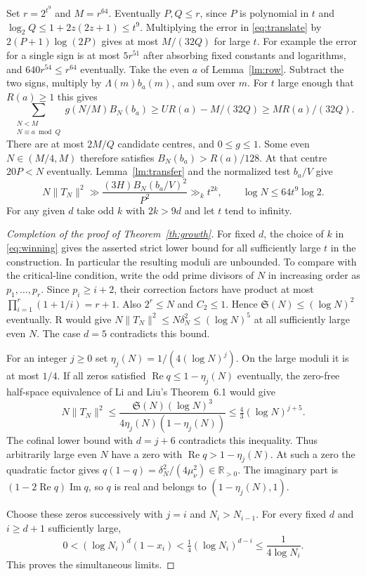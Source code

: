 \documentclass[11pt,a4paper]{article}
\newcommand{\SSg}{\mathfrak S}
\DeclareMathOperator{\Rea}{Re}
\begin{document}
Set $r=2^{t^9}$ and $M=r^{64}$. Eventually $P,Q\le r$, since $P$ is polynomial in $t$ and $\log_2 Q\le 1+2z(2z+1)\le t^9$. Multiplying the error in \eqref{eq:translate} by $2(P+1)\log(2P)$ gives at most $M/(32Q)$ for large $t$. For example the error for a single sign is at most $5r^{51}$ after absorbing fixed constants and logarithms, and $640r^{54}\le r^{64}$ eventually. Take the even $a$ of Lemma~\ref{lm:row}. Subtract the two signs, multiply by $\Lambda(m)b_a(m)$, and sum over $m$. For $t$ large enough that $R(a)\ge1$ this gives
\[
 \sum_{\substack{N<M\\N\equiv a\bmod Q}}g(N/M) B_N(b_a)
 \ge U R(a)-M/(32Q)\ge M R(a)/(32Q).
\]
There are at most $2M/Q$ candidate centres, and $0\le g\le1$. Some even $N\in(M/4,M)$ therefore satisfies $B_N(b_a)>R(a)/128$. At that centre $20P<N$ eventually. Lemma~\ref{lm:transfer} and the normalized test $b_a/V$ give
\begin{equation}\label{eq:winning}
  N\|T_N\|^2\gg \frac{(3H)B_N(b_a/V)^2}{P^2}
       \gg_k t^{2k},\qquad \log N\le64t^9\log2 .
\end{equation}
For any given $d$ take odd $k$ with $2k>9d$ and let $t$ tend to infinity.

\begin{proof}[Completion of the proof of Theorem~\ref{th:growth}]
For fixed $d$, the choice of $k$ in \eqref{eq:winning} gives the asserted strict lower bound for all sufficiently large $t$ in the construction. In particular the resulting moduli are unbounded. To compare with the critical-line condition, write the odd prime divisors of $N$ in increasing order as $p_1,\dots,p_r$. Since $p_i\ge i+2$, their correction factors have product at most $\prod_{i=1}^r(1+1/i)=r+1$. Also $2^r\le N$ and $C_2\le1$. Hence $\SSg(N)\le(\log N)^2$ eventually. R would give
$N\|T_N\|^2\le N\delta_N^2\le(\log N)^5$ at all sufficiently large even $N$. The case $d=5$ contradicts this bound.

For an integer $j\ge0$ set $\eta_j(N)=1/(4(\log N)^j)$. On the large moduli it is at most $1/4$. If all zeros satisfied $\Rea q\le1-\eta_j(N)$ eventually, the zero-free half-space equivalence of Li and Liu's Theorem~6.1 would give
\[
 N\|T_N\|^2\le\frac{\SSg(N)(\log N)^3}{4\eta_j(N)(1-\eta_j(N))}
             \le \tfrac43(\log N)^{j+5}.
\]
The cofinal lower bound with $d=j+6$ contradicts this inequality. Thus arbitrarily large even $N$ have a zero with $\Rea q>1-\eta_j(N)$. At such a zero the quadratic factor gives $q(1-q)=\delta_N^2/(4\mu_\nu^2)\in\mathbb R_{>0}$. The imaginary part is $(1-2\Rea q)\operatorname{Im}q$, so $q$ is real and belongs to $(1-\eta_j(N),1)$.

Choose these zeros successively with $j=i$ and $N_i>N_{i-1}$. For every fixed $d$ and $i\ge d+1$ sufficiently large,
\[
 0<(\log N_i)^d(1-x_i)<\tfrac14(\log N_i)^{d-i}\le \frac1{4\log N_i}.
\]
This proves the simultaneous limits.
\end{proof}
\end{document}
